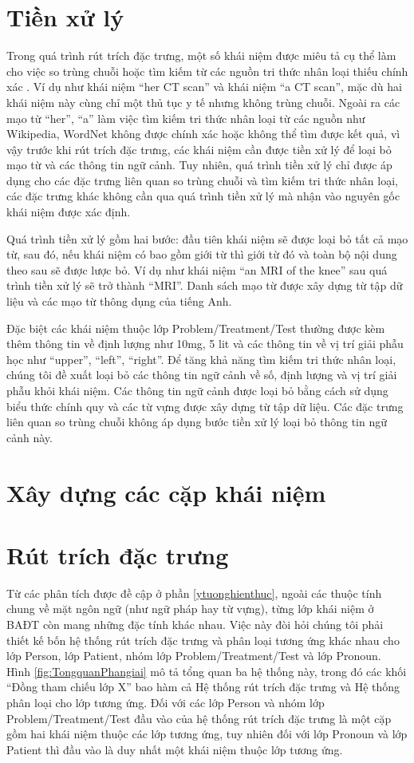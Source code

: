 \section{Tiền xử lý}
Trong quá trình rút trích đặc trưng, một số khái niệm được miêu tả cụ thể làm cho việc so trùng chuỗi hoặc tìm kiếm từ các nguồn tri thức nhân loại thiếu chính xác \cite{YanXu2012}. Ví dụ như khái niệm ``her CT scan'' và khái niệm ``a CT scan'', mặc dù hai khái niệm này cùng chỉ một thủ tục y tế nhưng không trùng chuỗi. Ngoài ra các mạo từ ``her'', ``a'' làm việc tìm kiếm tri thức nhân loại từ các nguồn như Wikipedia, WordNet không được chính xác hoặc không thể tìm được kết quả, vì vậy trước khi rút trích đặc trưng, các khái niệm cần được tiền xử lý để loại bỏ mạo từ và các thông tin ngữ cảnh. Tuy nhiên, quá trình tiền xử lý chỉ được áp dụng cho các đặc trưng liên quan so trùng chuỗi và tìm kiếm tri thức nhân loại, các đặc trưng khác không cần qua quá trình tiền xử lý mà nhận vào nguyên gốc khái niệm được xác định.

Quá trình tiền xử lý gồm hai bước: đầu tiên khái niệm sẽ được loại bỏ tất cả mạo từ, sau đó, nếu khái niệm có bao gồm giới từ thì giới từ đó và toàn bộ nội dung theo sau sẽ được lược bỏ. Ví dụ như khái niệm “an MRI of the knee” sau quá trình tiền xử lý sẽ trở thành “MRI”. Danh sách mạo từ được xây dựng từ tập dữ liệu và các mạo từ thông dụng của tiếng Anh.

Đặc biệt các khái niệm thuộc lớp Problem/Treatment/Test thường được kèm thêm thông tin về định lượng như 10mg, 5 lit và các thông tin về vị trí giải phẫu học như ``upper'', ``left'', ``right''. Để tăng khả năng tìm kiếm tri thức nhân loại, chúng tôi đề xuất loại bỏ các thông tin ngữ cảnh về số, định lượng và vị trí giải phẫu khỏi khái niệm. Các thông tin ngữ cảnh được loại bỏ bằng cách sử dụng biểu thức chính quy và các từ vựng được xây dựng từ tập dữ liệu. Các đặc trưng liên quan so trùng chuỗi không áp dụng bước tiền xử lý loại bỏ thông tin ngữ cảnh này.
\section{Xây dựng các cặp khái niệm}
\section{Rút trích đặc trưng}
Từ các phân tích được đề cập ở phần \ref{ytuonghienthuc}, ngoài các thuộc tính chung về mặt ngôn ngữ (như ngữ pháp hay từ vựng), từng lớp khái niệm ở BAĐT còn mang những đặc tính khác nhau. Việc này đòi hỏi chúng tôi phải thiết kế bốn hệ thống rút trích đặc trưng và phân loại tương ứng khác nhau cho lớp Person, lớp Patient, nhóm lớp Problem/Treatment/Test và lớp Pronoun. Hình \ref{fig:TongquanPhangiai} mô tả tổng quan ba hệ thống này, trong đó các khối ``Đồng tham chiếu lớp X'' bao hàm cả Hệ thống rút trích đặc trưng và Hệ thống phân loại cho lớp tương ứng. Đối với các lớp Person và nhóm lớp Problem/Treatment/Test đầu vào của hệ thống rút trích đặc trưng là một cặp gồm hai khái niệm thuộc các lớp tương ứng, tuy nhiên đối với lớp Pronoun và lớp Patient thì đầu vào là duy nhất một khái niệm thuộc lớp tương ứng.

